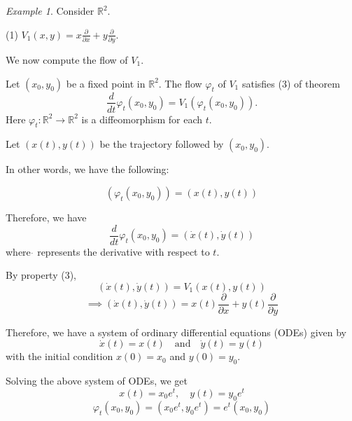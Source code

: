 \documentclass[11pt]{article}
\theoremstyle{definition}
\theoremstyle{remark}
\newtheorem{example}{Example}[section]
\begin{document}
\begin{example}\label{ex:vector_field_1}
Consider $\mathbb{R}^2$.

(1) $V_1(x,y) = x \frac{\partial}{\partial x} + y \frac{\partial}{\partial y}$.

\begin{center}
\end{center}

We now compute the flow of $V_1$.

Let $(x_0, y_0)$ be a fixed point in $\mathbb{R}^2$. The flow $\varphi_t$ of $V_1$ satisfies (3) of theorem
\[
\frac{d}{dt} \varphi_t (x_0, y_0) = V_1 (\varphi_t (x_0, y_0)).
\]
Here $\varphi_t : \mathbb{R}^2 \to \mathbb{R}^2$ is a diffeomorphism for each $t$.

Let $(x(t), y(t))$ be the trajectory followed by $(x_0, y_0)$.
\end{example}

In other words, we have the following:

\[
(\varphi_t(x_0, y_0)) = (x(t), y(t))
\]

Therefore, we have
\[
\frac{d}{dt} \varphi_t(x_0, y_0) = (\dot{x}(t), \dot{y}(t))
\]
where $\dot{}$ represents the derivative with respect to $t$.

By property (3),
\[
(\dot{x}(t), \dot{y}(t)) = V_1(x(t), y(t))
\]
\[
\implies (\dot{x}(t), \dot{y}(t)) = x(t) \frac{\partial}{\partial x} + y(t) \frac{\partial}{\partial y}
\]

Therefore, we have a system of ordinary differential equations (ODEs) given by
\[
\dot{x}(t) = x(t) \quad \text{and} \quad \dot{y}(t) = y(t)
\]
with the initial condition $x(0) = x_0$ and $y(0) = y_0$.

Solving the above system of ODEs, we get
\[
x(t) = x_0 e^{t}, \quad y(t) = y_0 e^{t}
\]
\[
\varphi_t(x_0, y_0) = (x_0 e^{t}, y_0 e^{t}) = e^{t}(x_0, y_0)
\]
\end{document}
